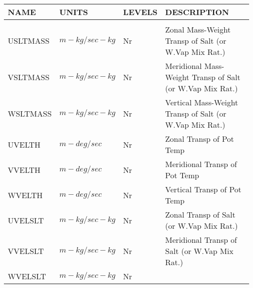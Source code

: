 \newpage
\vspace*{\fill}
\begin{table}
\begin{tabular}{llll}
\hline\hline
 NAME & UNITS & LEVELS & DESCRIPTION \\
\hline

&\\
 USLTMASS & $m-kg/sec-kg$ & Nr
         &\begin{minipage}[t]{3in}
          {Zonal Mass-Weight Transp of Salt (or W.Vap Mix Rat.)} 
         \end{minipage}\\
 VSLTMASS & $m-kg/sec-kg$ & Nr
         &\begin{minipage}[t]{3in}
          {Meridional Mass-Weight Transp of Salt (or W.Vap Mix Rat.)} 
         \end{minipage}\\
 WSLTMASS & $m-kg/sec-kg$ & Nr
         &\begin{minipage}[t]{3in}
          {Vertical Mass-Weight Transp of Salt (or W.Vap Mix Rat.)} 
         \end{minipage}\\
 UVELTH   & $m-deg/sec$ & Nr
         &\begin{minipage}[t]{3in}
          {Zonal Transp of Pot Temp} 
         \end{minipage}\\
 VVELTH   & $m-deg/sec$ & Nr
         &\begin{minipage}[t]{3in}
          {Meridional Transp of Pot Temp} 
         \end{minipage}\\
 WVELTH   & $m-deg/sec$ & Nr
         &\begin{minipage}[t]{3in}
          {Vertical Transp of Pot Temp} 
         \end{minipage}\\
 UVELSLT  & $m-kg/sec-kg$ & Nr
         &\begin{minipage}[t]{3in}
          {Zonal Transp of Salt (or W.Vap Mix Rat.)} 
         \end{minipage}\\
 VVELSLT  & $m-kg/sec-kg$ & Nr
         &\begin{minipage}[t]{3in}
          {Meridional Transp of Salt (or W.Vap Mix Rat.)} 
         \end{minipage}\\
 WVELSLT  & $m-kg/sec-kg$ & Nr
         &\begin{minipage}[t]{3in}

\end{minipage}
\end{tabular}
\end{table}
